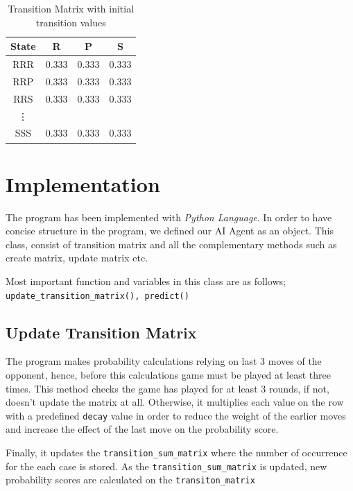 \documentclass{IEEEtran}
\begin{document}
	\begin{table}[h!]
		\begin{center}
					\caption{Transition Matrix with initial transition values}
			\begin{tabular}{c | c  c  c}
				State &  R & P & S \\
				\hline
				RRR & 0.333 & 0.333 & 0.333 \\
				RRP & 0.333 & 0.333 & 0.333 \\
				RRS & 0.333 & 0.333 & 0.333 \\
				\vdots \\
				SSS & 0.333 & 0.333 & 0.333 \\
			\end{tabular}
		\end{center}
	\end{table}
	
	\section{Implementation}
	
	The program has been implemented with \textit{Python Language}. In order to have concise structure in the program, we defined our AI Agent as an object. This class, consist of transition matrix and all the complementary methods such as create matrix, update matrix etc.
	
	Most important function and variables in this class are as follows; \texttt{update\_transition\_matrix(), predict()}
	
	\subsection{Update Transition Matrix}
		The program makes probability calculations relying on last 3 moves of the opponent, hence, before this calculations game must be played at least three times. This method checks the game has played for at least 3 rounds, if not, doesn't update the matrix at all. Otherwise, it multiplies each value on the row with a predefined \texttt{decay} value in order to reduce the weight of the earlier moves and increase the effect of the last move on the probability score.
		
		Finally, it updates the \texttt{transition\_sum\_matrix} where the number of occurrence for the each case is stored. As the \texttt{transition\_sum\_matrix} is updated, new probability scores are calculated on the \texttt{transiton\_matrix}
		
\end{document}
